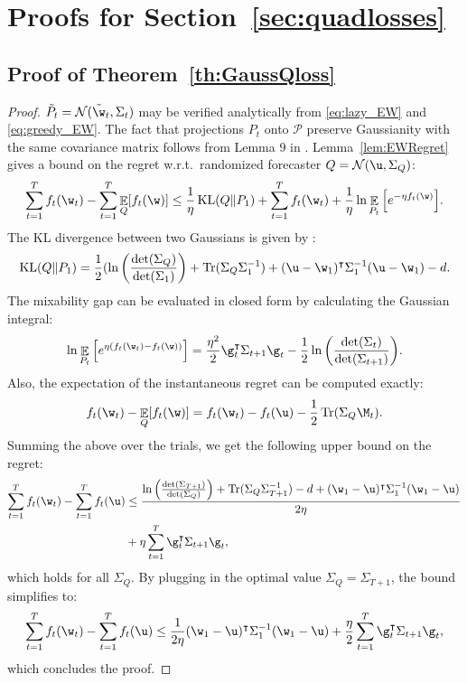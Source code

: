 \documentclass{colt2018} %
\DeclareMathOperator*{\E}{\mathbb{E}}
\DeclareMathOperator{\kl}{KL}
\DeclareMathOperator{\Tr}{Tr}			%
\renewcommand{\top}{\intercal}
\newcommand{\domainP}{\mathcal{P}}
\newcommand{\normal}{\mathcal{N}}       %
\begin{document}
\section{Proofs for Section~\ref{sec:quadlosses}}

\subsection{Proof of Theorem~\ref{th:GaussQloss}}\label{sec:detailproofgausquadratic}
\begin{proof}
$\tilde{P}_t = \normal(\tilde{\w}_t, \Sigma_t)$ may be verified analytically from \eqref{eq:lazy_EW} and \eqref{eq:greedy_EW}. The fact that projections $P_t$ onto $\domainP$ preserve Gaussianity with the same covariance matrix follows from Lemma 9 in \citet{VanErvenKoolen2016}. Lemma~\ref{lem:EWRegret} gives a bound on the regret w.r.t.\ randomized forecaster $Q = \normal(\u, \Sigma_Q)$:
\[
    \sum_{t=1}^T f_t(\w_t) - \sum_{t=1}^T \E_{Q}[f_t(\w)] \leq
    \frac{1}{\eta}\kl(Q\|P_1) + \sum_{t=1}^T f_t(\w_t) + \frac{1}{\eta}
    \ln\E_{P_t}\Big[e^{-\eta f_t(\w)}\Big].
\]
% 
The KL divergence between two Gaussians is given by \citep[Theorem 1.8.2]{ihara1993information}: 
\[
  \kl(Q\|P_1) = \frac{1}{2}(\ln\bigg(\frac{\det(\Sigma_Q)}{\det(\Sigma_1)}\bigg) +
    \Tr(\Sigma_Q \Sigma_1^{-1}) + (\u - \w_1)^\top\Sigma_1^{-1}(\u -
    \w_1) - d.
\]
% 
The mixability gap can be evaluated in closed form by calculating the Gaussian integral:
\[
    \ln \E_{P_t}\Big[e^{\eta ( f_t(\w_t) - f_t(\w))}\Big] =
    \frac{\eta^2}{2}\g_t^\top\Sigma_{t+1}\g_t -
    \frac{1}{2}\ln\bigg(\frac{\det(\Sigma_t)}{\det(\Sigma_{t+1})}\bigg).
\]
% 
Also, the expectation of the instantaneous regret can be computed exactly:
\[
    f_t(\w_t) - \E_{Q}[f_t(\w)] = f_t(\w_t) - f_t(\u) - \frac{1}{2}\Tr(\Sigma_Q \M_t).
\]
% 
Summing the above over the trials, we get the following upper bound on the regret:
\begin{align*}
  \sum_{t=1}^T f_t(\w_t) - \sum_{t=1}^T f_t(\u) 
  &\leq \frac{\ln \Big( \frac{\det(\Sigma_{T+1})}{\det(\Sigma_Q)}\Big) +
\Tr(\Sigma_Q\Sigma_{T+1}^{-1}) - d + (\w_1 - \u)^\top \Sigma_1^{-1}(\w_1 - \u)}{2 \eta} \\
&+ \eta \sum_{t=1}^T\g_t^\top\Sigma_{t+1}\g_t,
\end{align*}
% 
which holds for all $\Sigma_Q$. By plugging in the optimal value 
$\Sigma_Q =\Sigma_{T+1}$, the bound simplifies to:
\[
    \sum_{t=1}^T f_t(\w_t) - \sum_{t=1}^T f_t(\u) \leq \frac{1}{2\eta} (\w_1 -
    \u)^\top \Sigma_1^{-1}(\w_1 - \u) + \frac{\eta}{2}\sum_{t=1}^T\g_t^\top\Sigma_{t+1}\g_t,
\]
% 
which concludes the proof.
\end{proof}
% 
% 
% 
% 
% 
% 
% 
% 
% 
% 
% 
% 
% 
% 
% 
% 
% 
% 
% 
% 
% 
% 
% 
% 
% 
% 
% 
% 
% 
% 
% 
% 
% 
% 
% 
% 
% 
% 
% 
% 
% 
% 
% 
% 
% 
% 
% 
% 
% 
% 
% 
% 
% 
% 
\end{document}
